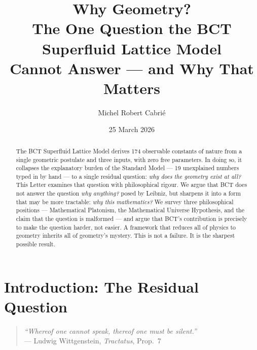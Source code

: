 \documentclass[aps,prl,twocolumn,superscriptaddress,floatfix]{revtex4-2}
\begin{document}

\title{Why Geometry?\\
The One Question the BCT Superfluid Lattice Model\\
Cannot Answer --- and Why That Matters}

\author{Michel Robert Cabri\'e}

\date{25 March 2026}

\begin{abstract}
The BCT Superfluid Lattice Model derives 174 observable constants of 
nature from a single geometric postulate and three inputs, with zero 
free parameters. In doing so, it collapses the explanatory burden of 
the Standard Model --- 19 unexplained numbers typed in by hand --- 
to a single residual question: \emph{why does the geometry exist at all?} 
This Letter examines that question with philosophical rigour. We argue 
that BCT does not answer the question \emph{why anything?} posed by 
Leibniz, but sharpens it into a form that may be more tractable: 
\emph{why this mathematics?} We survey three philosophical positions 
--- Mathematical Platonism, the Mathematical Universe Hypothesis, 
and the claim that the question is malformed --- and argue that BCT's 
contribution is precisely to make the question harder, not easier. 
A framework that reduces all of physics to geometry inherits all of 
geometry's mystery. This is not a failure. It is the sharpest possible 
result.
\end{abstract}

\maketitle

\section{Introduction: The Residual Question}

\begin{quote}
\emph{``Whereof one cannot speak, thereof one must be silent.''}\\
\hfill --- Ludwig Wittgenstein, \textit{Tractatus}, Prop.~7
\end{quote}

\vspace{4pt}
\end{document}
